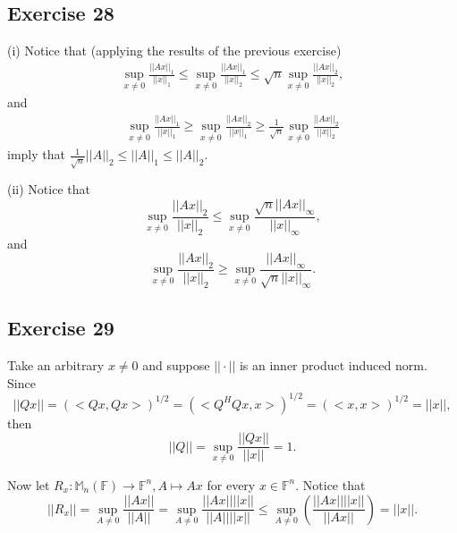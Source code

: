 \documentclass[11.5pt, letterpaper, bibtotoc,
    tablecaptionabove, figurecaptionabove]{article}
\begin{document}
\subsection*{Exercise 28}
(i)
Notice that (applying the results of the previous exercise)
\begin{align*}
    \sup_{x\neq 0}\frac{||Ax||_1}{||x||_1}\leq
    \sup_{x\neq 0}\frac{||Ax||_1}{||x||_2}\leq
    \sqrt{n}\sup_{x\neq 0}\frac{||Ax||_2}{||x||_2},
\end{align*}
and
\begin{align*}
    \sup_{x\neq 0}\frac{||Ax||_1}{||x||_1}\geq
    \sup_{x\neq 0}\frac{||Ax||_2}{||x||_1}\geq
    \frac{1}{\sqrt{n}}\sup_{x\neq 0}\frac{||Ax||_2}{||x||_2}
\end{align*}
imply that $\frac{1}{\sqrt{n}}||A||_2\leq||A||_1\leq||A||_2$.

(ii)
Notice that
\begin{equation*}
    \sup_{x\neq 0}\frac{||Ax||_2}{||x||_2}\leq
    \sup_{x\neq 0}\frac{\sqrt{n}||Ax||_\infty}{||x||_\infty},
\end{equation*}
and
\begin{equation*}
    \sup_{x\neq 0}\frac{||Ax||_2}{||x||_2}\geq
    \sup_{x\neq 0}\frac{||Ax||_\infty}{\sqrt{n}||x||_\infty}.
\end{equation*}

\subsection*{Exercise 29}
Take an arbitrary $x\neq 0$ and suppose $||\cdot||$ is an inner product induced norm.
Since
\begin{equation*}
    ||Qx||=\left(<Qx,Qx>\right)^{1/2}=
    \left(<Q^HQx,x>\right)^{1/2}=
    \left(<x,x>\right)^{1/2}=
    ||x||,
\end{equation*}
then 
\begin{equation*}
    ||Q||=\sup_{x\neq 0}\frac{||Qx||}{||x||}=1.
\end{equation*}

Now let $R_x:\mathbb M_n(\mathbb F)\to\mathbb F^n, A\mapsto Ax$ for every $x\in\mathbb F^n$.
Notice that
\begin{equation*}
    ||R_x||=\sup_{A\neq 0}\frac{||Ax||}{||A||}=
    \sup_{A\neq 0}\frac{||Ax||||x||}{||A||||x||}\leq
    \sup_{A\neq 0}\left(\frac{||Ax||||x||}{||Ax||}\right)=
    ||x||.
\end{equation*}
\end{document}
